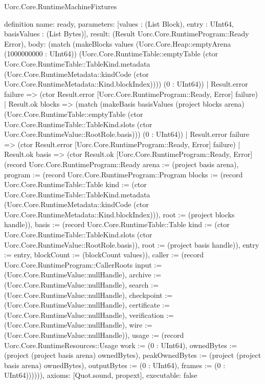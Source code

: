 \begin{lexlean}{Uorc.Core.RuntimeMachineFixtures}
\begin{semanticmodule}
definition{
  name: ready,
  parameters: [values : (List Block), entry : UInt64, basisValues : (List Bytes)],
  result: (Result Uorc.Core.RuntimeProgram::Ready Error),
  body: (match (makeBlocks values (Uorc.Core.Heap::emptyArena (1000000000 : UInt64)) (Uorc.Core.RuntimeTable::emptyTable (ctor Uorc.Core.RuntimeTable::TableKind.metadata (Uorc.Core.RuntimeMetadata::kindCode (ctor Uorc.Core.RuntimeMetadata::Kind.blockIndex)))) (0 : UInt64))
    | Result.error failure => (ctor Result.error [Uorc.Core.RuntimeProgram::Ready, Error] failure)
    | Result.ok blocks => (match (makeBasis basisValues (project blocks arena) (Uorc.Core.RuntimeTable::emptyTable (ctor Uorc.Core.RuntimeTable::TableKind.slots (ctor Uorc.Core.RuntimeValue::RootRole.basis))) (0 : UInt64))
      | Result.error failure => (ctor Result.error [Uorc.Core.RuntimeProgram::Ready, Error] failure)
      | Result.ok basis => (ctor Result.ok [Uorc.Core.RuntimeProgram::Ready, Error] (record Uorc.Core.RuntimeProgram::Ready {arena := (project basis arena), program := (record Uorc.Core.RuntimeProgram::Program {blocks := (record Uorc.Core.RuntimeTable::Table {kind := (ctor Uorc.Core.RuntimeTable::TableKind.metadata (Uorc.Core.RuntimeMetadata::kindCode (ctor Uorc.Core.RuntimeMetadata::Kind.blockIndex))), root := (project blocks handle)}), basis := (record Uorc.Core.RuntimeTable::Table {kind := (ctor Uorc.Core.RuntimeTable::TableKind.slots (ctor Uorc.Core.RuntimeValue::RootRole.basis)), root := (project basis handle)}), entry := entry, blockCount := (blockCount values)}), caller := (record Uorc.Core.RuntimeProgram::CallerRoots {input := (Uorc.Core.RuntimeValue::nullHandle), archive := (Uorc.Core.RuntimeValue::nullHandle), search := (Uorc.Core.RuntimeValue::nullHandle), checkpoint := (Uorc.Core.RuntimeValue::nullHandle), certificate := (Uorc.Core.RuntimeValue::nullHandle), verification := (Uorc.Core.RuntimeValue::nullHandle), wire := (Uorc.Core.RuntimeValue::nullHandle)}), usage := (record Uorc.Core.RuntimeResources::Usage {work := (0 : UInt64), ownedBytes := (project (project basis arena) ownedBytes), peakOwnedBytes := (project (project basis arena) ownedBytes), outputBytes := (0 : UInt64), frames := (0 : UInt64)})})))),
  axioms: [Quot.sound, propext],
  executable: false
}
\end{semanticmodule}
\end{lexlean}
